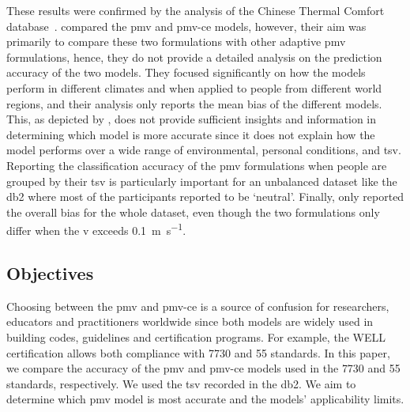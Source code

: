 These results were confirmed by the analysis of the Chinese Thermal Comfort database~\cite{du_evaluation_2022}.
 compared the \ac{pmv} and \ac{pmv-ce} models, however, their aim was primarily to compare these two formulations with other adaptive \ac{pmv} formulations, hence, they do not provide a detailed analysis on the prediction accuracy of the two models.
They focused significantly on how the models perform in different climates and when applied to people from different world regions, and their analysis only reports the mean bias of the different models.
This, as depicted by , does not provide sufficient insights and information in determining which model is more accurate since it does not explain how the model performs over a wide range of environmental, personal conditions, and \ac{tsv}.
Reporting the classification accuracy of the \ac{pmv} formulations when people are grouped by their \ac{tsv} is particularly important for an unbalanced dataset like the \ac{db2} where most of the participants reported to be `neutral'.
Finally,  only reported the overall bias for the whole dataset, even though the two formulations only differ when the \ac{v} exceeds \qty{0.1}{\m\per\s}.

\subsection{Objectives}\label{subsec:aim-and-objectives}
Choosing between the \ac{pmv} and \ac{pmv-ce} is a source of confusion for researchers, educators and practitioners worldwide since both models are widely used in building codes, guidelines and certification programs.
For example, the WELL certification allows both compliance with \gls{7730} and \gls{55} standards.
In this paper, we compare the accuracy of the \ac{pmv} and \ac{pmv-ce} models used in the \gls{7730} and \gls{55} standards, respectively.
We used the \ac{tsv} recorded in the \acf{db2}.
We aim to determine which \ac{pmv} model is most accurate and the models' applicability limits.
